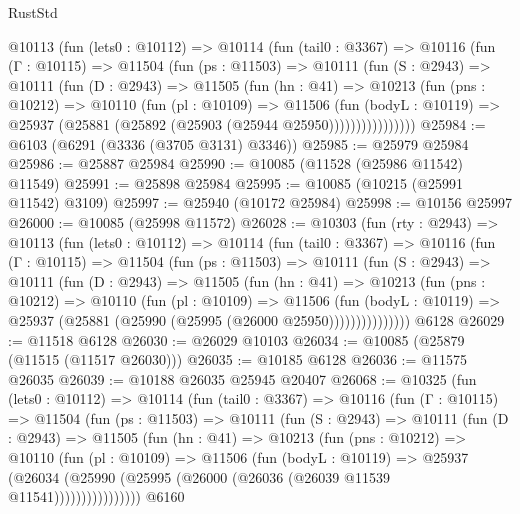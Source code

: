 \begin{lexlean}{RustStd}
\begin{coremodule}
      @10113
        (fun (lets0 : @10112) =>
        @10114
          (fun (tail0 : @3367) =>
          @10116
            (fun (Γ : @10115) =>
            @11504
              (fun (ps : @11503) =>
              @10111
                (fun (S : @2943) =>
                @10111
                  (fun (D : @2943) =>
                  @11505
                    (fun (hn : @41) =>
                    @10213
                      (fun (pns : @10212) =>
                      @10110
                        (fun (pl : @10109) =>
                        @11506
                          (fun (bodyL : @10119) =>
                          @25937 (@25881 (@25892 (@25903 (@25944 @25950))))))))))))))))
@25984 := @6103 (@6291 (@3336 (@3705 @3131) @3346))
@25985 := @25979 @25984
@25986 := @25887 @25984
@25990 := @10085 (@11528 (@25986 @11542) @11549)
@25991 := @25898 @25984
@25995 := @10085 (@10215 (@25991 @11542) @3109)
@25997 := @25940 (@10172 @25984)
@25998 := @10156 @25997
@26000 := @10085 (@25998 @11572)
@26028 := @10303
    (fun (rty : @2943) =>
    @10113
      (fun (lets0 : @10112) =>
      @10114
        (fun (tail0 : @3367) =>
        @10116
          (fun (Γ : @10115) =>
          @11504
            (fun (ps : @11503) =>
            @10111
              (fun (S : @2943) =>
              @10111
                (fun (D : @2943) =>
                @11505
                  (fun (hn : @41) =>
                  @10213
                    (fun (pns : @10212) =>
                    @10110
                      (fun (pl : @10109) =>
                      @11506
                        (fun (bodyL : @10119) =>
                        @25937 (@25881 (@25990 (@25995 (@26000 @25950)))))))))))))))
    @6128
@26029 := @11518 @6128
@26030 := @26029 @10103
@26034 := @10085 (@25879 (@11515 (@11517 @26030)))
@26035 := @10185 @6128
@26036 := @11575 @26035
@26039 := @10188 @26035 @25945 @20407
@26068 := @10325
    (fun (lets0 : @10112) =>
    @10114
      (fun (tail0 : @3367) =>
      @10116
        (fun (Γ : @10115) =>
        @11504
          (fun (ps : @11503) =>
          @10111
            (fun (S : @2943) =>
            @10111
              (fun (D : @2943) =>
              @11505
                (fun (hn : @41) =>
                @10213
                  (fun (pns : @10212) =>
                  @10110
                    (fun (pl : @10109) =>
                    @11506
                      (fun (bodyL : @10119) =>
                      @25937
                        (@26034
                          (@25990 (@25995 (@26000 (@26036 (@26039 @11539 @11541))))))))))))))))
    @6160

\end{coremodule}
\end{lexlean}
